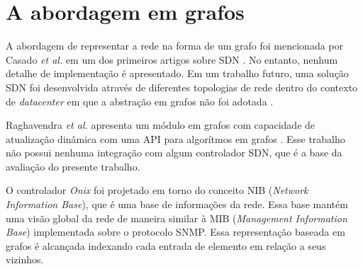 \section{A abordagem em grafos}

A abordagem de representar a rede na forma de um grafo foi mencionada 
por Casado \emph{et al.} em um dos primeiros artigos sobre SDN
\citep{martin2010virtualizing}.
No entanto, nenhum detalhe de implementação é apresentado.
Em um trabalho futuro, uma solução SDN foi desenvolvida através de 
diferentes topologias de rede dentro do contexto de \emph{datacenter} 
em que a abstração em grafos não foi adotada \citep{ripcord}. 

Raghavendra \emph{et al.} apresenta um módulo em grafos com capacidade 
de atualização dinâmica com uma API para algorítmos em grafos
\citep{ramya2012dynamic}.
Esse trabalho não possui nenhuma integração com algum controlador SDN,
que é a base da avaliação do presente trabalho.

O controlador \emph{Onix} \citep{teemu2010onix} foi projetado em torno do 
conceito NIB (\emph{Network Information Base}), que é uma base 
de informações da rede.
Essa base mantém uma visão global da rede de maneira similar à 
MIB (\emph{Management Information Base}) implementada sobre o
protocolo SNMP.
Essa representação baseada em grafos é alcançada indexando cada
entrada de elemento em relação a seus vizinhos.

